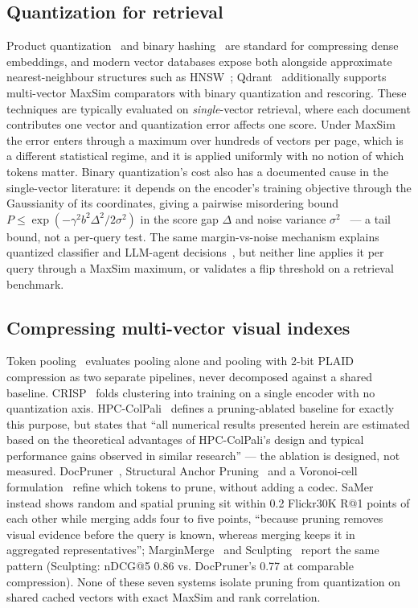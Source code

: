 \documentclass[conference]{IEEEtran}
\begin{document}
\subsection{Quantization for retrieval}
Product quantization~\cite{pq} and binary hashing~\cite{binaryhash} are standard
for compressing dense embeddings, and modern vector databases expose both
alongside approximate nearest-neighbour structures such as HNSW~\cite{hnsw};
Qdrant~\cite{qdrant} additionally supports multi-vector MaxSim comparators with
binary quantization and rescoring. These techniques are typically evaluated on
\emph{single}-vector retrieval, where each document contributes one vector and
quantization error affects one score. Under MaxSim the error enters through a
maximum over hundreds of vectors per page, which is a different statistical
regime, and it is applied uniformly with no notion of which tokens matter.
Binary quantization's cost also has a documented cause in the single-vector
literature: it depends on the encoder's training objective through the
Gaussianity of its coordinates, giving a pairwise misordering bound
$P \le \exp(-\gamma^2 b^2 \Delta^2 / 2\sigma^2)$ in the score gap $\Delta$ and
noise variance $\sigma^2$~\cite{covariance2026} --- a tail bound, not a
per-query test. The same margin-vs-noise mechanism explains quantized
classifier and LLM-agent decisions~\cite{hu2022quantized,lowbitdecisions2026},
but neither line applies it per query through a MaxSim maximum, or validates a
flip threshold on a retrieval benchmark.

\subsection{Compressing multi-vector visual indexes}
Token pooling~\cite{clavie2024pooling} evaluates pooling alone and pooling
with 2-bit PLAID compression as two separate pipelines, never decomposed
against a shared baseline. CRISP~\cite{crisp2025} folds clustering into
training on a single encoder with no quantization axis.
HPC-ColPali~\cite{hpccolpali2025} defines a pruning-ablated baseline for
exactly this purpose, but states that ``all numerical results presented
herein are estimated based on the theoretical advantages of HPC-ColPali's
design and typical performance gains observed in similar research'' --- the
ablation is designed, not measured. DocPruner~\cite{docpruner2025}, Structural
Anchor Pruning~\cite{structuralanchor2026} and a Voronoi-cell
formulation~\cite{voronoi2026} refine which tokens to prune, without adding a
codec. SaMer~\cite{samer2026} instead shows random and spatial pruning sit
within 0.2 Flickr30K R@1 points of each other while merging adds four to five
points, ``because pruning removes visual evidence before the query is known,
whereas merging keeps it in aggregated representatives'';
MarginMerge~\cite{marginmerge2026} and Sculpting~\cite{sculpting2026} report
the same pattern (Sculpting: nDCG@5 0.86 vs. DocPruner's 0.77 at comparable
compression). None of these seven systems isolate pruning from quantization
on shared cached vectors with exact MaxSim and rank correlation.
\end{document}
